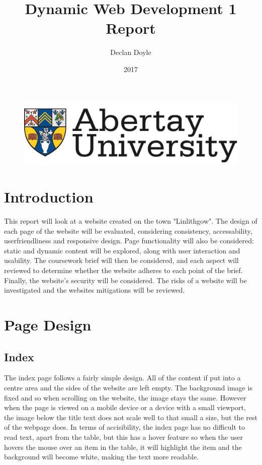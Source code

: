 \documentclass[12pt,a4paper]{article}
\title{Dynamic Web Development 1 Report}
\author{Declan Doyle}
\affil{BSc Ethical Hacking\\
		Abertay University\\
		Dundee, United Kingdom\\
		1600219@abertay.ac.uk}
\date{2017}
\begin{document}

	\begin{figure}
		\includegraphics[width=\linewidth]{img/Unilogo}
	\end{figure}


	\maketitle

	\page


	\newpage
	\tableofcontents
	\newpage



	\section{Introduction}
		This report will look at a website created on the town "Linlithgow". The design of each page of the website will be evaluated, considering consistency, accessability, userfriendliness and responsive design.
		Page functionality will also be considered: static and dynamic content will be explored, along with user interaction and usability.
		The coursework brief will then be considered, and each aspect will reviewed to determine whether the website adheres to each point of the brief.
		Finally, the website's security will be considered. The risks of a website will be investigated and the websites mitigations will be reviewed.

	\clearpage
	\section{Page Design}
		\subsection{Index}
		The index page follows a fairly simple design. All of the content if put into a centre area and the sides of the website are left empty. The background image is fixed and so when scrolling on the website, the image stays the same. However when the page is viewed on a mobile device or a device with a small viewport, the image below the title text does not scale well to that small a size, but the rest of the webpage does. In terms of accisibility, the index page has no difficult to read text, apart from the table, but this has a hover feature so when the user hovers the mouse over an item in the table, it will highlight the item and the background will become white, making the text more readable.
\end{document}
